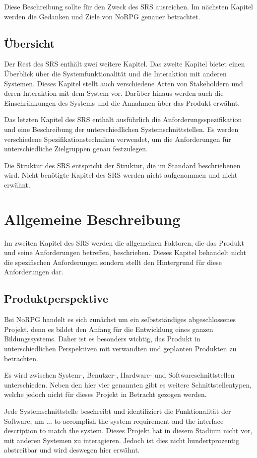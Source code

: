 		Diese Beschreibung sollte für den Zweck des SRS ausreichen. Im nächsten Kapitel werden die Gedanken und Ziele von NoRPG genauer betrachtet.
		
	\subsection{Übersicht}
		Der Rest des SRS enthält zwei weitere Kapitel. Das zweite Kapitel bietet einen Überblick über die Systemfunktionalität und die Interaktion mit anderen Systemen. Dieses Kapitel stellt auch verschiedene Arten von Stakeholdern und deren Interaktion mit dem System vor. Darüber hinaus werden auch die Einschränkungen des Systems und die Annahmen über das Produkt erwähnt.
	
		Das letzten Kapitel des SRS enthält ausführlich die Anforderungsspezifikation und eine Beschreibung der unterschiedlichen Systemschnittstellen. Es werden verschiedene Spezifikationstechniken verwendet, um die Anforderungen für unterschiedliche Zielgruppen genau festzulegen.
	
		Die Struktur des SRS entspricht der Struktur, die im Standard beschriebenen wird. Nicht benötigte Kapitel des SRS werden nicht aufgenommen und nicht erwähnt.
		
\section{Allgemeine Beschreibung}
	Im zweiten Kapitel des SRS werden die allgemeinen Faktoren, die das Produkt und seine Anforderungen betreffen, beschrieben. Dieses Kapitel behandelt nicht die spezifischen Anforderungen sondern stellt den Hintergrund für diese Anforderungen dar. 

	\subsection{Produktperspektive}
		Bei NoRPG handelt es sich zunächst um ein selbstständiges abgeschlossenes Projekt, denn es bildet den Anfang für die Entwicklung eines ganzen Bildungssystems. Daher ist es besonders wichtig, das Produkt in unterschiedlichen Perspektiven mit verwandten und geplanten Produkten zu betrachten. 
		
		Es wird zwischen System-, Benutzer-, Hardware- und Softwareschnittstellen unterschieden. Neben den hier vier genannten gibt es weitere Schnittstellentypen, welche jedoch nicht für dieses Projekt in Betracht gezogen werden. 
		
		Jede Systemschnittstelle beschreibt und identifiziert die Funktionalität der Software, um ... to accomplish the system requirement and the interface description to match the system. Dieses Projekt hat in diesem Stadium nicht vor, mit anderen Systemen zu interagieren. Jedoch ist dies nicht hundertprozentig abstreitbar und wird deswegen hier erwähnt.


